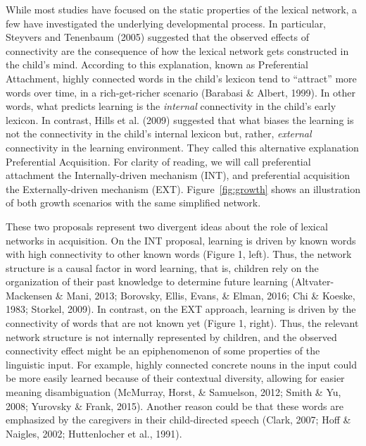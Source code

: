 \documentclass[english,floatsintext,man]{apa6}
\theoremstyle{definition}
\theoremstyle{definition}
\theoremstyle{definition}
\theoremstyle{remark}
\begin{document}
While most studies have focused on the static properties of the lexical
network, a few have investigated the underlying developmental process.
In particular, Steyvers and Tenenbaum (2005) suggested that the observed
effects of connectivity are the consequence of how the lexical network
gets constructed in the child's mind. According to this explanation,
known as Preferential Attachment, highly connected words in the child's
lexicon tend to \enquote{attract} more words over time, in a
rich-get-richer scenario (Barabasi \& Albert, 1999). In other words,
what predicts learning is the \emph{internal} connectivity in the
child's early lexicon. In contrast, Hills et al. (2009) suggested that
what biases the learning is not the connectivity in the child's internal
lexicon but, rather, \emph{external} connectivity in the learning
environment. They called this alternative explanation Preferential
Acquisition. For clarity of reading, we will call preferential
attachment the Internally-driven mechanism (INT), and preferential
acquisition the Externally-driven mechanism (EXT).
Figure~\ref{fig:growth} shows an illustration of both growth scenarios
with the same simplified network.

These two proposals represent two divergent ideas about the role of
lexical networks in acquisition. On the INT proposal, learning is driven
by known words with high connectivity to other known words (Figure 1,
left). Thus, the network structure is a causal factor in word learning,
that is, children rely on the organization of their past knowledge to
determine future learning (Altvater-Mackensen \& Mani, 2013; Borovsky,
Ellis, Evans, \& Elman, 2016; Chi \& Koeske, 1983; Storkel, 2009). In
contrast, on the EXT approach, learning is driven by the connectivity of
words that are not known yet (Figure 1, right). Thus, the relevant
network structure is not internally represented by children, and the
observed connectivity effect might be an epiphenomenon of some
properties of the linguistic input. For example, highly connected
concrete nouns in the input could be more easily learned because of
their contextual diversity, allowing for easier meaning disambiguation
(McMurray, Horst, \& Samuelson, 2012; Smith \& Yu, 2008; Yurovsky \&
Frank, 2015). Another reason could be that these words are emphasized by
the caregivers in their child-directed speech (Clark, 2007; Hoff \&
Naigles, 2002; Huttenlocher et al., 1991).
\end{document}
